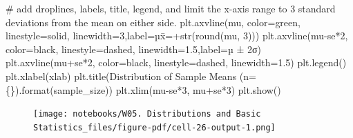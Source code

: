 \documentclass[
  letterpaper,
  DIV=11,
  numbers=noendperiod]{scrreprt}
\newenvironment{Shaded}{\begin{snugshade}}{\end{snugshade}}
\newcommand{\BuiltInTok}[1]{\textcolor[rgb]{0.00,0.23,0.31}{#1}}
\newcommand{\CommentTok}[1]{\textcolor[rgb]{0.37,0.37,0.37}{#1}}
\newcommand{\DecValTok}[1]{\textcolor[rgb]{0.68,0.00,0.00}{#1}}
\newcommand{\FloatTok}[1]{\textcolor[rgb]{0.68,0.00,0.00}{#1}}
\newcommand{\NormalTok}[1]{\textcolor[rgb]{0.00,0.23,0.31}{#1}}
\newcommand{\OperatorTok}[1]{\textcolor[rgb]{0.37,0.37,0.37}{#1}}
\newcommand{\SpecialCharTok}[1]{\textcolor[rgb]{0.37,0.37,0.37}{#1}}
\newcommand{\StringTok}[1]{\textcolor[rgb]{0.13,0.47,0.30}{#1}}
\begin{document}
\begin{Shaded}
\begin{Highlighting}[]
    \CommentTok{\# add droplines, labels, title, legend, and limit the x{-}axis range to 3 standard deviations from the mean on either side.}
\NormalTok{    plt.axvline(mu, color}\OperatorTok{=}\StringTok{\textquotesingle{}green\textquotesingle{}}\NormalTok{, linestyle}\OperatorTok{=}\StringTok{\textquotesingle{}solid\textquotesingle{}}\NormalTok{, linewidth}\OperatorTok{=}\DecValTok{3}\NormalTok{,label}\OperatorTok{=}\StringTok{\textquotesingle{}µx̄=\textquotesingle{}}\OperatorTok{+}\BuiltInTok{str}\NormalTok{(}\BuiltInTok{round}\NormalTok{(mu, }\DecValTok{3}\NormalTok{)))}
\NormalTok{    plt.axvline(mu}\OperatorTok{{-}}\NormalTok{se}\OperatorTok{*}\DecValTok{2}\NormalTok{, color}\OperatorTok{=}\StringTok{\textquotesingle{}black\textquotesingle{}}\NormalTok{, linestyle}\OperatorTok{=}\StringTok{\textquotesingle{}dashed\textquotesingle{}}\NormalTok{, linewidth}\OperatorTok{=}\FloatTok{1.5}\NormalTok{,label}\OperatorTok{=}\StringTok{\textquotesingle{}µ ± 2σ\textquotesingle{}}\NormalTok{)}
\NormalTok{    plt.axvline(mu}\OperatorTok{+}\NormalTok{se}\OperatorTok{*}\DecValTok{2}\NormalTok{, color}\OperatorTok{=}\StringTok{\textquotesingle{}black\textquotesingle{}}\NormalTok{, linestyle}\OperatorTok{=}\StringTok{\textquotesingle{}dashed\textquotesingle{}}\NormalTok{, linewidth}\OperatorTok{=}\FloatTok{1.5}\NormalTok{)}
\NormalTok{    plt.legend()}
\NormalTok{    plt.xlabel(xlab)    }
\NormalTok{    plt.title(}\StringTok{\textquotesingle{}Distribution of Sample Means (n=}\SpecialCharTok{\{\}}\StringTok{)\textquotesingle{}}\NormalTok{.}\BuiltInTok{format}\NormalTok{(sample\_size))}
\NormalTok{    plt.xlim(mu}\OperatorTok{{-}}\NormalTok{se}\OperatorTok{*}\DecValTok{3}\NormalTok{, mu}\OperatorTok{+}\NormalTok{se}\OperatorTok{*}\DecValTok{3}\NormalTok{)}
\NormalTok{    plt.show()  }
\end{Highlighting}
\end{Shaded}

\begin{Shaded}
\end{Shaded}

\begin{figure}[H]

{\centering \texttt{[image: notebooks/W05. Distributions and Basic Statistics\_files/figure-pdf/cell-26-output-1.png]}

}

\end{figure}
\end{document}
